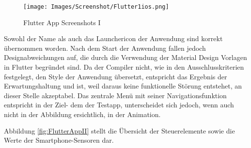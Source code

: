 \begin{figure}[!ht]
 \texttt{[image: Images/Screenshot/Flutter1ios.png]}
 \caption{Flutter App Screenshots I}
 \label{fig:FlutterAppI}
\end{figure}
 Sowohl der Name als auch das Launchericon der Anwendung sind korrekt übernommen worden.  Nach dem Start der Anwendung fallen jedoch Designabweichungen auf, die durch die Verwendung der Material Design Vorlagen in Flutter begründet sind.  Da der Compiler nicht,  wie in den Ausschlusskriterien festgelegt, den Style der Anwendung übersetzt,  entspricht das Ergebnis der Erwartungshaltung und ist,  weil daraus keine funktionelle Störung
entstehet,  an dieser Stelle akzeptabel.  Das zentrale Menü mit seiner Navigationsfunktion entspricht in der Ziel- dem der Testapp,  
unterscheidet sich jedoch,  wenn auch nicht in der Abbildung ersichtlich,  in der Animation. 

Abbildung \ref{fig:FlutterAppII} stellt die Übersicht der Steuerelemente sowie die Werte der Smartphone-Sensoren dar.

